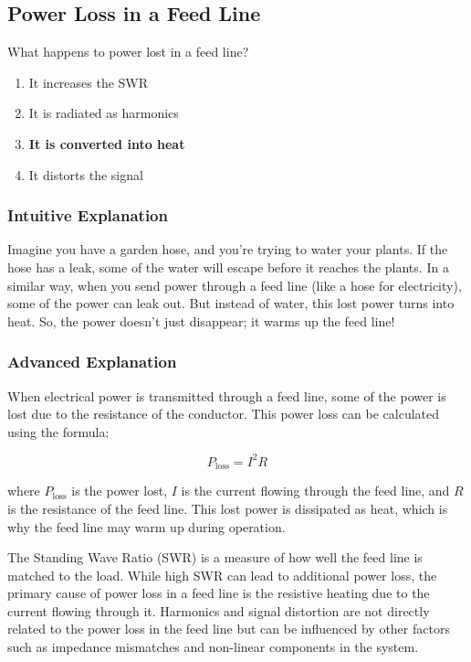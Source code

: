 \subsection{Power Loss in a Feed Line}
\label{T7C07}

\begin{tcolorbox}[colback=gray!10!white,colframe=black!75!black,title=T7C07]
What happens to power lost in a feed line?
\begin{enumerate}[label=\Alph*)]
    \item It increases the SWR
    \item It is radiated as harmonics
    \item \textbf{It is converted into heat}
    \item It distorts the signal
\end{enumerate}
\end{tcolorbox}

\subsubsection{Intuitive Explanation}
Imagine you have a garden hose, and you're trying to water your plants. If the hose has a leak, some of the water will escape before it reaches the plants. In a similar way, when you send power through a feed line (like a hose for electricity), some of the power can leak out. But instead of water, this lost power turns into heat. So, the power doesn't just disappear; it warms up the feed line!

\subsubsection{Advanced Explanation}
When electrical power is transmitted through a feed line, some of the power is lost due to the resistance of the conductor. This power loss can be calculated using the formula:

\[
P_{\text{loss}} = I^2 R
\]

where \( P_{\text{loss}} \) is the power lost, \( I \) is the current flowing through the feed line, and \( R \) is the resistance of the feed line. This lost power is dissipated as heat, which is why the feed line may warm up during operation.

The Standing Wave Ratio (SWR) is a measure of how well the feed line is matched to the load. While high SWR can lead to additional power loss, the primary cause of power loss in a feed line is the resistive heating due to the current flowing through it. Harmonics and signal distortion are not directly related to the power loss in the feed line but can be influenced by other factors such as impedance mismatches and non-linear components in the system.

